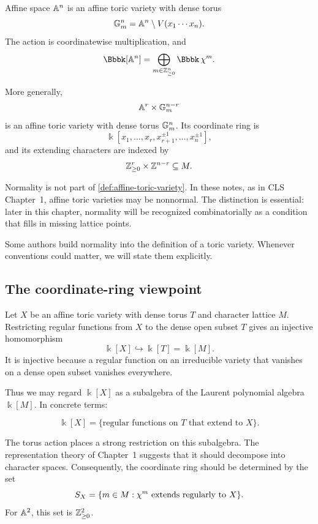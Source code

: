 \begin{example}
Affine space \(\mathbb{A}^n\) is an affine toric variety with dense torus
\[
\mathbb{G}_{m}^n
=
\mathbb{A}^n\setminus V(x_1\cdots x_n).
\]
The action is coordinatewise multiplication, and
\[
\Bbbk[\AAA^n]
=
\bigoplus_{m\in\ZZ_{\geq0}^n}
\Bbbk\,\character{m}.
\]
\end{example}

\begin{example}
More generally,
\[
\mathbb{A}^r\times\mathbb{G}_{m}^{n-r}
\]
is an affine toric variety with dense torus \(\mathbb{G}_{m}^n\). Its coordinate
ring is
\[
\Bbbk[x_1,\ldots,x_r,
x_{r+1}^{\pm1},\ldots,x_n^{\pm1}],
\]
and its extending characters are indexed by
\[
\mathbb{Z}_{\geq0}^r\times\mathbb{Z}^{n-r}\subseteq M.
\]
\end{example}

\begin{warningbox}
Normality is not part of \cref{def:affine-toric-variety}. In these
notes, as in CLS Chapter~1, affine toric varieties may be nonnormal.
The distinction is essential: later in this chapter, normality will be
recognized combinatorially as a condition that fills in missing
lattice points.

Some authors build normality into the definition of a toric variety.
Whenever conventions could matter, we will state them explicitly.
\end{warningbox}

\subsection{The coordinate-ring viewpoint}

Let \(X\) be an affine toric variety with dense torus \(T\) and
character lattice \(M\). Restricting regular functions from \(X\) to
the dense open subset \(T\) gives an injective homomorphism
\[
\Bbbk[X]\hookrightarrow\Bbbk[T]=\Bbbk[M].
\]
It is injective because a regular function on an irreducible variety
that vanishes on a dense open subset vanishes everywhere.

Thus we may regard \(\Bbbk[X]\) as a subalgebra of the Laurent
polynomial algebra \(\Bbbk[M]\). In concrete terms:

\[
\boxed{
\Bbbk[X]
=
\{\text{regular functions on \(T\) that extend to \(X\)}\}.
}
\]

The torus action places a strong restriction on this subalgebra. The
representation theory of Chapter~1 suggests that it should decompose
into character spaces. Consequently, the coordinate ring should be
determined by the set
\[
S_X
=
\{m\in M:\chi^{m}\text{ extends regularly to }X\}.
\]
For \(\mathbb{A}^2\), this set is \(\mathbb{Z}_{\geq0}^2\).

